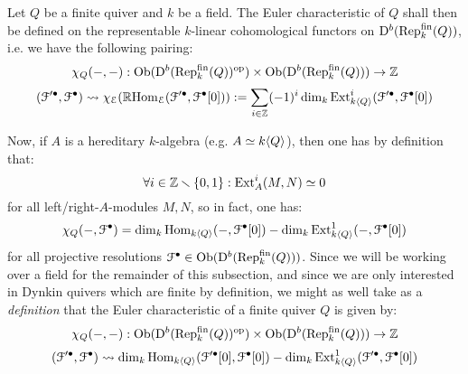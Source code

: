            \begin{example} \label{example: euler_characteristics_of_quiver_representations}
                Let $Q$ be a finite quiver and $k$ be a field. The Euler characteristic of $Q$ shall then be defined on the representable $k$-linear cohomological functors on $\mathrm{D}^b(\mathrm{Rep}_k^{\mathrm{fin}}(Q))$, i.e. we have the following pairing:
                    $$\chi_Q(-, -): \Ob(\rmD^b(\Rep_k^{\fin}(Q))^{\op}) \x \Ob(\rmD^b(\Rep_k^{\fin}(Q))) \to \Z$$
                    $$(\mathcal{F}'^{\bullet}, \mathcal{F}^{\bullet}) \leadsto \chi_{\mathcal{E}}(\mathbb{R}\mathrm{Hom}_{\mathcal{E}}(\mathcal{F}'^{\bullet}, \mathcal{F}^{\bullet}[0])) := \sum_{i \in \mathbb{Z}} (-1)^i \dim_k \mathrm{Ext}^i_{k\langle Q\rangle}(\mathcal{F}'^{\bullet}, \mathcal{F}^{\bullet}[0])$$
                
                Now, if $A$ is a hereditary $k$-algebra (e.g. $A \simeq k\langle Q\rangle$), then one has by definition that:
                    $$\forall i \in \mathbb{Z} \smallsetminus \{0, 1\}: \mathrm{Ext}^i_A(M, N) \simeq 0$$
                for all left/right-$A$-modules $M, N$, so in fact, one has:
                    $$\chi_Q(-, \mathcal{F}^{\bullet}) = \dim_k \mathrm{Hom}_{k\langle Q\rangle}(-, \mathcal{F}^{\bullet}[0]) - \dim_k \mathrm{Ext}^1_{k\langle Q\rangle}(-, \mathcal{F}^{\bullet}[0])$$
                for all projective resolutions $\mathcal{F}^{\bullet} \in \mathrm{Ob}(\mathrm{D}^b(\mathrm{Rep}_k^{\mathrm{fin}}(Q)))$. Since we will be working over a field for the remainder of this subsection, and since we are only interested in Dynkin quivers which are finite by definition, we might as well take as a \textit{definition} that the Euler characteristic of a finite quiver $Q$ is given by:
                    $$\chi_Q(-, -): \Ob(\rmD^b(\Rep_k^{\fin}(Q))^{\op}) \x \Ob(\rmD^b(\Rep_k^{\fin}(Q))) \to \Z$$
                    $$(\mathcal{F}'^{\bullet}, \mathcal{F}^{\bullet}) \leadsto \dim_k \mathrm{Hom}_{k\langle Q\rangle}(\mathcal{F}'^{\bullet}[0], \mathcal{F}^{\bullet}[0]) - \dim_k \mathrm{Ext}^1_{k\langle Q\rangle}(\mathcal{F}'^{\bullet}, \mathcal{F}^{\bullet}[0])$$
            \end{example}
            
